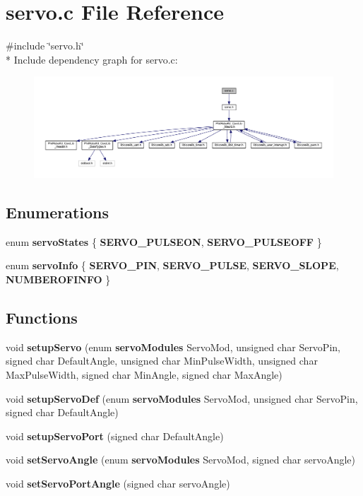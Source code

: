 \section{servo.\-c File Reference}
\label{servo_8c}
{\ttfamily \#include \char`\"{}servo.\-h\char`\"{}}\\*
Include dependency graph for servo.\-c\-:\nopagebreak
\begin{figure}[H]
\begin{center}
\leavevmode
\includegraphics[width=350pt]{servo_8c__incl}
\end{center}
\end{figure}
\subsection*{Enumerations}
\begin{DoxyCompactItemize}
\item 
enum {\bf servo\-States} \{ {\bf S\-E\-R\-V\-O\-\_\-\-P\-U\-L\-S\-E\-O\-N}, 
{\bf S\-E\-R\-V\-O\-\_\-\-P\-U\-L\-S\-E\-O\-F\-F}
 \}
\item 
enum {\bf servo\-Info} \{ {\bf S\-E\-R\-V\-O\-\_\-\-P\-I\-N}, 
{\bf S\-E\-R\-V\-O\-\_\-\-P\-U\-L\-S\-E}, 
{\bf S\-E\-R\-V\-O\-\_\-\-S\-L\-O\-P\-E}, 
{\bf N\-U\-M\-B\-E\-R\-O\-F\-I\-N\-F\-O}
 \}
\end{DoxyCompactItemize}
\subsection*{Functions}
\begin{DoxyCompactItemize}
\item 
void {\bf setup\-Servo} (enum {\bf servo\-Modules} Servo\-Mod, unsigned char Servo\-Pin, signed char Default\-Angle, unsigned char Min\-Pulse\-Width, unsigned char Max\-Pulse\-Width, signed char Min\-Angle, signed char Max\-Angle)
\item 
void {\bf setup\-Servo\-Def} (enum {\bf servo\-Modules} Servo\-Mod, unsigned char Servo\-Pin, signed char Default\-Angle)
\item 
void {\bf setup\-Servo\-Port} (signed char Default\-Angle)
\item 
void {\bf set\-Servo\-Angle} (enum {\bf servo\-Modules} Servo\-Mod, signed char servo\-Angle)
\item 
void {\bf set\-Servo\-Port\-Angle} (signed char servo\-Angle)
\end{DoxyCompactItemize}


